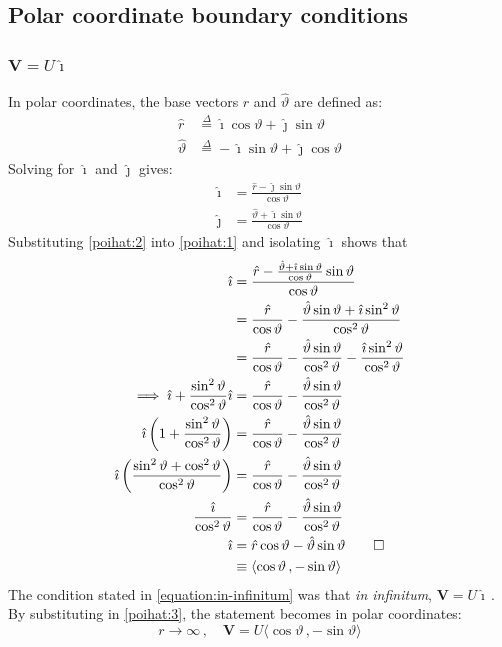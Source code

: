 \documentclass[a4paper,12pt]{article}
\newcommand{\ihat}{\hat{\imath}}
\newcommand{\jhat}{\hat{\jmath}}
\newcommand{\rhat}{\hat{r}}
\newcommand{\thetahat}{\hat{\theta}}
\renewcommand{\theta}{\vartheta}      		%
\newcommand{\definedas}{\stackrel{\Delta}{=}}     			%
\begin{document}
\subsection{Polar coordinate boundary conditions}
\subsubsection{$\mathbf{V}=U\ihat$}
In polar coordinates, the base vectors $\rhat$ and $\thetahat$ are defined as:
\begin{align*}
	\rhat&\definedas\ihat\cos\theta+\jhat\sin\theta\\
	\thetahat&\definedas-\ihat\sin\theta+\jhat\cos\theta
\end{align*}
Solving for $\ihat$ and $\jhat$ gives:
\begin{align}
	\label{poihat:1}\ihat&=\frac{\rhat-\jhat\sin\theta}{\cos\theta}\\
	\label{poihat:2}\jhat&=\frac{\thetahat+\ihat\sin\theta}{\cos\theta}
\end{align}
Substituting \ref{poihat:2} into \ref{poihat:1} and isolating $\ihat$ shows that
\begin{align}
	\notag\ihat&=\frac{\rhat-\frac{\thetahat+\ihat\sin\theta}{\cos\theta}\sin\theta}{\cos\theta}\\
	\notag&=\frac{\rhat}{\cos\theta}-\frac{\thetahat\sin\theta+\ihat\sin^2\theta}{\cos^2\theta}\\
	\notag&=\frac{\rhat}{\cos\theta}-\frac{\thetahat\sin\theta}{\cos^2\theta}-\frac{\ihat\sin^2\theta}{\cos^2\theta}\\
	\notag\implies\ihat+\frac{\sin^2\theta}{\cos^2\theta}\ihat&=\frac{\rhat}{\cos\theta}-\frac{\thetahat\sin\theta}{\cos^2\theta}\\
	\notag\ihat\left(1+\frac{\sin^2\theta}{\cos^2\theta}\right)&=\frac{\rhat}{\cos\theta}-\frac{\thetahat \sin\theta}{\cos^2\theta}\\
	\notag\ihat\left(\frac{\sin^2\theta+\cos^2\theta}{\cos^2\theta}\right)&=\frac{\rhat}{\cos\theta}-\frac{\thetahat \sin\theta}{\cos^2\theta}\\
	\notag\frac{\ihat}{\cos^2\theta}&=\frac{\rhat}{\cos\theta}-\frac{\thetahat \sin\theta}{\cos^2\theta}\\
	\label{poihat:3}\ihat&=\rhat\cos\theta-\thetahat\sin\theta\qed\\
	\notag&\equiv\langle\cos\theta\,,-\sin\theta\rangle
\end{align}
The condition stated in \ref{equation:in-infinitum} was that \textit{in infinitum}, $\mathbf{V}=U\ihat$\,. By substituting in \ref{poihat:3}, the statement becomes in polar coordinates:
$$
	r\rightarrow\infty\,,\quad\mathbf{V}=U\langle\cos\theta\,,-\sin\theta\rangle
$$
\end{document}
